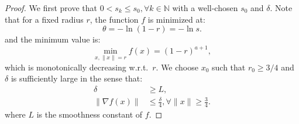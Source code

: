 \documentclass{article}
\theoremstyle{plain}
\theoremstyle{definition}
\theoremstyle{remark}
\newcommand*{\NN}{\mathbb{N}}
\begin{document}
\begin{proof}
    We first prove that $0 < s_k \leq s_0, \forall k \in \NN$ with a well-chosen $s_0$ and $\delta$.
    Note that for a fixed radius $r$, the function $f$ is minimized at:
    \begin{equation*}
        \theta = - \ln (1 - r) = - \ln s.
    \end{equation*}
    and the minimum value is:
    \begin{equation*}
        \min_{x, \|x\| = r} f(x) = (1 - r)^{a + 1},
    \end{equation*}
    which is monotonically decreasing w.r.t.~$r$. 
    We choose $x_0$ such that $r_0 \geq 3/4$ and $\delta$ is sufficiently large in the sense that:
    \begin{equation*}
        \begin{aligned}
            \delta & \geq L, \\
            \|\nabla f(x)\| & \leq \frac{\delta}{4}, \forall \|x\| \geq \frac{3}{4}.
        \end{aligned}
    \end{equation*}
    where $L$ is the smoothness constant of $f$. 


\end{proof}
\end{document}
